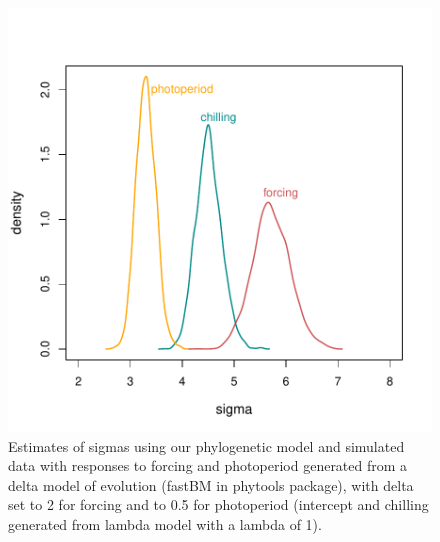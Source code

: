 \documentclass[11pt]{article}
\begin{document}
\clearpage
\begin{figure}
  \begin{center}
  \includegraphics[width=14cm]{../../analyses/phylogeny/figures/burstmodelfigquick.pdf}
  \caption{Estimates of sigmas using our phylogenetic model and simulated data with responses to forcing and photoperiod generated from a delta model of evolution (fastBM in phytools package), with delta set to 2 for forcing and to 0.5 for photoperiod (intercept and chilling generated from lambda model with a lambda of 1).}
  \label{fig:burstmodels}
  \end{center}
\end{figure}
\end{document}
